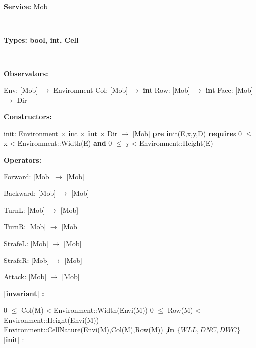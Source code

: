 \documentclass[11pt]{article}
\begin{document}
\vspace*{0.5cm}
\begin{huge}
\textbf{Service:}	Mob
\end{huge}\\


\begin{large}
\textbf{Types:	bool, int, Cell} 
\end{large}\\

\begin{large}
\textbf{Observators:} 
\end{large}

Env: [Mob] $\rightarrow$ Environment
Col: [Mob] $\rightarrow$ \textbf{in}t
Row: [Mob] $\rightarrow$ \textbf{in}t
Face: [Mob] $\rightarrow$ Dir\\

\begin{large}
\textbf{Constructors:} 
\end{large}

init: Environment $\times$ \textbf{in}t $\times$ \textbf{in}t $\times$ Dir $\rightarrow$ [Mob]
\textbf{pre} \textbf{in}it(E,x,y,D) \textbf{require}s 0 $\leq$ x < Environment::Width(E)
\textbf{and} 0 $\leq$ y < Environment::Height(E)\\

\begin{large}
\textbf{Operators:} 
\end{large}

Forward: [Mob] $\rightarrow$ [Mob]

Backward: [Mob] $\rightarrow$ [Mob]

TurnL: [Mob] $\rightarrow$ [Mob]

TurnR: [Mob] $\rightarrow$ [Mob]

StrafeL: [Mob] $\rightarrow$ [Mob]

StrafeR: [Mob] $\rightarrow$ [Mob]

Attack: [Mob] $\rightarrow$ [Mob]



\begin{large}
\textbf{[invariant] :} 
\end{large}

0 $\leq$ Col(M) < Environment::Width(Envi(M))
0 $\leq$ Row(M) < Environment::Height(Envi(M))
Environment::CellNature(Envi(M),Col(M),Row(M)) $\not\textbf{in}$
$\{WLL, DNC, DWC\}$\\

[\textbf{init}] :
\end{document}
